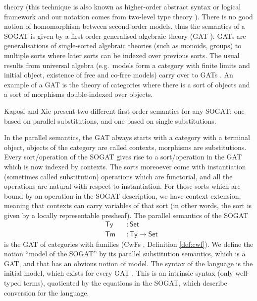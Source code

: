 \documentclass[sigplan,10pt,anonymous,review]{acmart}\settopmatter{printfolios=true,printccs=false,printacmref=false}
\newcommand{\ra}{\rightarrow}
\newcommand{\Set}{\mathsf{Set}}
\newcommand{\Ty}{\mathsf{Ty}}
\newcommand{\Tm}{\mathsf{Tm}}
\begin{document}
theory (this technique is also known as higher-order abstract syntax
\cite{DBLP:conf/lics/Hofmann99} or logical framework
\cite{DBLP:journals/jacm/HarperHP93,10.1007/978-3-642-14203-1_2} and
our notation comes from two-level type theory \cite{DBLP:conf/csl/AltenkirchCK16,DBLP:journals/mscs/AnnenkovCKS23}). There is no good notion of homomorphism between
second-order models, thus the semantics of a SOGAT is given by a first
order generalised algebraic theory (GAT
\cite{DBLP:journals/apal/Cartmell86}). GATs are generalisations of
single-sorted algebraic theories (such as monoids, groups) to multiple
sorts where later sorts can be indexed over previous sorts. The usual
results from universal algebra (e.g.\ models form a category with
finite limits and initial object, existence of free and co-free
models) carry over to GATs \cite{andras,DBLP:phd/hal/Moeneclaey22}. An
example of a GAT is the theory of categories where there is a sort of
objects and a sort of morphisms double-indexed over objects.

Kaposi and Xie \cite{DBLP:conf/fscd/KaposiX24} present two different
first order semantics for any SOGAT: one based on parallel
substitutions, and one based on single substitutions.

In the parallel semantics, the GAT always starts with a category with
a terminal object, objects of the category are called contexts,
morphisms are substitutions. Every sort/operation of the SOGAT gives
rise to a sort/operation in the GAT which is now indexed by
contexts. The sorts moreoever come with instantiation (sometimes
called substitution) operations which are functorial, and all the
operations are natural with respect to instantiation. For those sorts
which are bound by an operation in the SOGAT description, we have
context extension, meaning that contexts can carry variables of that
sort (in other words, the sort is given by a locally representable
presheaf). The parallel semantics of the SOGAT
\begin{equation}\label{eq:tytm}
\begin{alignedat}{10}
  & \Ty && : \Set \\
  & \Tm && : \Ty \ra\Set 
\end{alignedat}
\end{equation}
is the GAT of categories with families (CwFs
\cite{DBLP:conf/types/Dybjer95,Castellan2021}, Definition \ref{def:cwf}).
We define the notion ``model of the SOGAT'' by its parallel substitution
semantics, which is a GAT, and that has an obvious notion of model. The
syntax of the language is the initial model, which exists for every
GAT \cite{DBLP:journals/pacmpl/KaposiKA19}. This is an intrinsic
syntax (only well-typed terms), quotiented by the equations in the
SOGAT, which describe conversion for the language.
\end{document}

